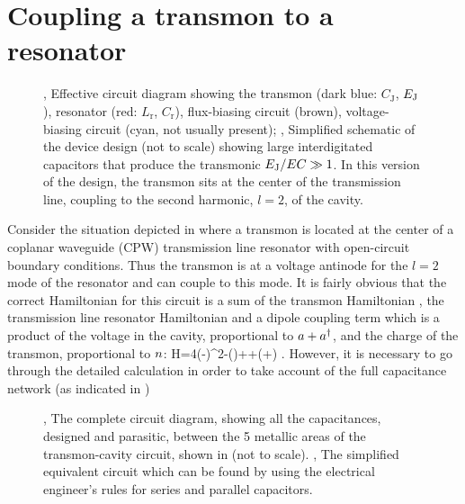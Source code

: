 \section{Coupling a transmon to a resonator}\label{sec:cqed}%
\begin{figure}[tb]%
 \centering
 \caption[Coupling a transmon to a resonator]{
 , Effective circuit diagram showing the transmon (dark blue: $C_\text{J}$, $E_{\text{J}}$), resonator (red: $L_\text{r}$, $C_\text{r}$), flux-biasing circuit (brown), voltage-biasing circuit (cyan, not usually present); , Simplified schematic of the device design (not to scale) showing large interdigitated capacitors that produce the transmonic $E_{\text{J}}/EC\gg1$. In this version of the design, the transmon sits at the center of the transmission line, coupling to the second harmonic, $l=2$, of the cavity.\label{fig:coupling}}
\end{figure}%
Consider the situation depicted in  where a transmon is located at the center of a coplanar waveguide (CPW)%
transmission line resonator with open-circuit boundary conditions. Thus the transmon is at a voltage antinode for the $l=2$ mode of the resonator and can couple to this mode. It is fairly obvious that the correct Hamiltonian for this circuit is a sum of the transmon Hamiltonian , the transmission line resonator Hamiltonian  and a dipole coupling term which is a product of the voltage in the cavity, proportional to ${a}+{a}^{\dag}$, and the charge of the transmon, proportional to ${n}$:
\be
    \label{eq:genrabiham1}
    H=4\EC(\nh-\ngate)^2-\EJ\cos(\vph)+\hbar\omr\aop\dg\aop+\beta \nh(\aop\dg+\aop) .
\ee%
However, it is necessary to go through the detailed calculation in order to take account of the full capacitance network (as indicated in )
\begin{figure}
 \centering
 \caption[The capacitance network for the transmon in a CPW resonator]{ , The complete circuit diagram, showing all the capacitances, designed and parasitic, between the 5 metallic areas of the transmon-cavity circuit, shown in  (not to scale). , The simplified equivalent circuit which can be found by using the electrical engineer's rules for series and parallel capacitors.\label{fig:capnet}}
\end{figure}%
